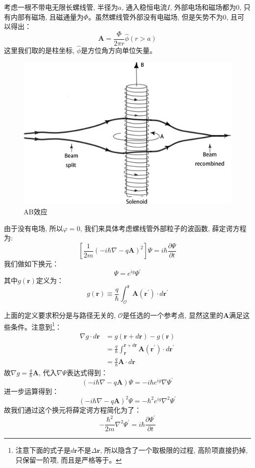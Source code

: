 \documentclass[a4paper,zihao=-4,linespread=1]{ctexrep}
\begin{document}
    考虑一根不带电无限长螺线管, 半径为$a$, 通入稳恒电流$I$, 外部电场和磁场都为$0$, 只有内部有磁场, 且磁通量为$\Phi$。虽然螺线管外部没有电磁场, 但是矢势不为$0$, 且可以得出：
    \[\mathbf{A}=\frac{\Phi}{2\pi r}\hat\phi(r>a)\]
    这里我们取的是柱坐标, $\hat{\phi}$是方位角方向单位矢量。
    \begin{figure}[htbp]
        \centering
        \includegraphics[scale=0.1]{fig/4-3.eps}
        \caption{AB效应}
        \label{AB效应}
    \end{figure}
    由于没有电场, 所以$\varphi=0$, 我们来具体考虑螺线管外部粒子的波函数, 薛定谔方程为:
    \[\left[\frac{1}{2 m}(-i \hbar \nabla-q \mathbf{A})^{2}\right] \Psi=i \hbar \frac{\partial \Psi}{\partial t}\]
    我们做如下换元：
    \[\Psi=e^{ig}\Psi^\prime\]
    其中$g(\mathbf{r})$定义为：
    \begin{equation}
        \label{eq:4.113}
        g(\mathbf{r})\equiv\frac{q}{\hbar}\int_\mathcal{O}^\mathbf{r}\mathbf{A}(\mathbf{r}^\prime)\cdot d\mathbf{r}^\prime
    \end{equation}
    
    上面的定义要求积分是与路径无关的, $\mathcal{O}$是任选的一个参考点, 显然这里的$\mathbf{A}$满足这些条件。注意到\footnote{注意下面的式子是$d\mathbf{r}$不是$\Delta\mathbf{r}$, 所以隐含了一个取极限的过程, 高阶项直接扔掉, 只保留一阶项, 而且是严格等于。}：
    \begin{align*}
        \nabla g\cdot d\mathbf{r}&=g(\mathbf{r}+d\mathbf{r})-g(\mathbf{r})\\
        &=\frac{q}{\hbar}\int_{\mathbf{r}}^{\mathbf{r}+d\mathbf{r}}\mathbf{A}(\mathbf{r}^\prime)\cdot d\mathbf{r}^\prime\\
        &=\frac{q}{\hbar}\mathbf{A}\cdot d\mathbf{r}
    \end{align*}
    故$ \nabla g=\frac{q}{\hbar}\mathbf{A}$, 代入$\nabla \Psi$表达式得到：
    \[(-i \hbar \nabla-q \mathbf{A}) \Psi=-i \hbar e^{i g} \nabla \Psi^\prime\]
    进一步运算得到：
    \[(-i \hbar \nabla-q \mathbf{A})^{2} \Psi=-\hbar^{2} e^{i g} \nabla^{2} \Psi^{\prime}\]
    故我们通过这个换元将薛定谔方程简化为了：
    \[-\frac{\hbar^{2}}{2 m} \nabla^{2} \Psi^{\prime}=i \hbar \frac{\partial \Psi^{\prime}}{\partial t}\]
    
\end{document}
